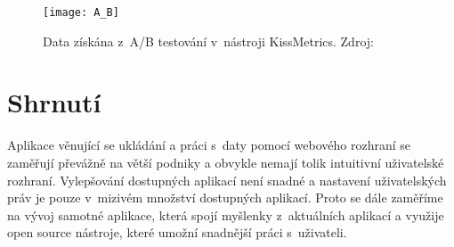 \begin{figure}[!htp]
\centering
\texttt{[image: A\_B]}
\caption[Data získána z~A/B testování v~nástroji KissMetrics]{Data získána z~A/B testování v~nástroji KissMetrics. Zdroj: \cite{kiss-ab}}
\label{ab-fig}
\end{figure}
\newpage
\section{Shrnutí}
\par Aplikace věnující se ukládání a práci s~daty pomocí webového rozhraní se zaměřují převážně na větší podniky a obvykle nemají tolik intuitivní uživatelské rozhraní. Vylepšování dostupných aplikací není snadné a nastavení uživatelských práv je pouze v~mizivém množství dostupných aplikací. Proto se dále zaměříme na vývoj samotné aplikace, která spojí myšlenky z~aktuálních aplikací a využije open source nástroje, které umožní snadnější práci s~uživateli.

